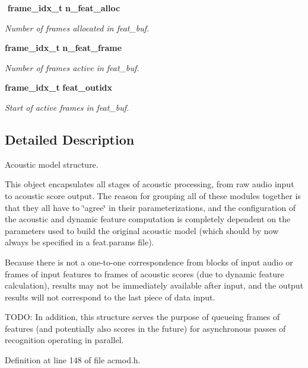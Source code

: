 \begin{DoxyCompactItemize}
$$\mbox{\label{structacmod__s_a8269cb11354683ba83f1994b46e15466}} 
\textbf{ frame\+\_\+idx\+\_\+t} \textbf{ n\+\_\+feat\+\_\+alloc}
\begin{DoxyCompactList}\small\item\em Number of frames allocated in feat\+\_\+buf. \end{DoxyCompactList}\item 
\mbox{\label{structacmod__s_a861cc097befe7e81473f0ae0972186e0}} 
\textbf{ frame\+\_\+idx\+\_\+t} \textbf{ n\+\_\+feat\+\_\+frame}
\begin{DoxyCompactList}\small\item\em Number of frames active in feat\+\_\+buf. \end{DoxyCompactList}\item 
\mbox{\label{structacmod__s_ae15076737bcdcbe1d5b4226f7a0b3f5b}} 
\textbf{ frame\+\_\+idx\+\_\+t} \textbf{ feat\+\_\+outidx}
\begin{DoxyCompactList}\small\item\em Start of active frames in feat\+\_\+buf. \end{DoxyCompactList}\end{DoxyCompactItemize}


\subsection{Detailed Description}
Acoustic model structure. 

This object encapsulates all stages of acoustic processing, from raw audio input to acoustic score output. The reason for grouping all of these modules together is that they all have to \char`\"{}agree\char`\"{} in their parameterizations, and the configuration of the acoustic and dynamic feature computation is completely dependent on the parameters used to build the original acoustic model (which should by now always be specified in a feat.\+params file).

Because there is not a one-\/to-\/one correspondence from blocks of input audio or frames of input features to frames of acoustic scores (due to dynamic feature calculation), results may not be immediately available after input, and the output results will not correspond to the last piece of data input.

T\+O\+DO\+: In addition, this structure serves the purpose of queueing frames of features (and potentially also scores in the future) for asynchronous passes of recognition operating in parallel. 

Definition at line 148 of file acmod.\+h.



